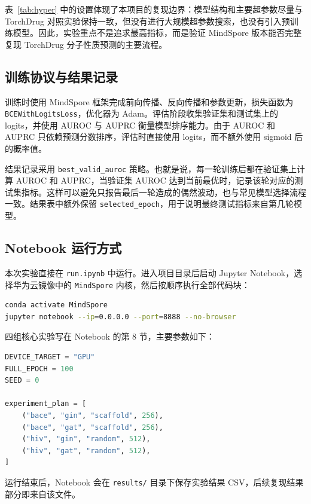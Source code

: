 \documentclass[12pt,hyperref,a4paper,UTF8]{ctexart}
\begin{document}
表~\ref{tab:hyper} 中的设置体现了本项目的复现边界：模型结构和主要超参数尽量与 TorchDrug 对照实验保持一致，但没有进行大规模超参数搜索，也没有引入预训练模型。因此，实验重点不是追求最高指标，而是验证 MindSpore 版本能否完整复现 TorchDrug 分子性质预测的主要流程。

\subsection{训练协议与结果记录}

训练时使用 MindSpore 框架完成前向传播、反向传播和参数更新，损失函数为 \texttt{BCEWithLogitsLoss}，优化器为 Adam。评估阶段收集验证集和测试集上的 logits，并使用 AUROC 与 AUPRC 衡量模型排序能力。由于 AUROC 和 AUPRC 只依赖预测分数排序，评估时直接使用 logits，而不额外使用 sigmoid 后的概率值。

结果记录采用 \texttt{best\_valid\_auroc} 策略。也就是说，每一轮训练后都在验证集上计算 AUROC 和 AUPRC，当验证集 AUROC 达到当前最优时，记录该轮对应的测试集指标。这样可以避免只报告最后一轮造成的偶然波动，也与常见模型选择流程一致。结果表中额外保留 \texttt{selected\_epoch}，用于说明最终测试指标来自第几轮模型。

\subsection{Notebook 运行方式}

本次实验直接在 \texttt{run.ipynb} 中运行。进入项目目录后启动 Jupyter Notebook，选择华为云镜像中的 \texttt{MindSpore} 内核，然后按顺序执行全部代码块：

\begin{lstlisting}[language=bash, caption={Jupyter Notebook 启动方式}]
conda activate MindSpore
jupyter notebook --ip=0.0.0.0 --port=8888 --no-browser
\end{lstlisting}

四组核心实验写在 Notebook 的第 8 节，主要参数如下：

\begin{lstlisting}[language=Python, caption={Notebook 中的主要实验参数}]
DEVICE_TARGET = "GPU"
FULL_EPOCH = 100
SEED = 0

experiment_plan = [
    ("bace", "gin", "scaffold", 256),
    ("bace", "gat", "scaffold", 256),
    ("hiv", "gin", "random", 512),
    ("hiv", "gat", "random", 512),
]
\end{lstlisting}

运行结束后，Notebook 会在 \texttt{results/} 目录下保存实验结果 CSV，后续复现结果部分即来自该文件。
\end{document}
